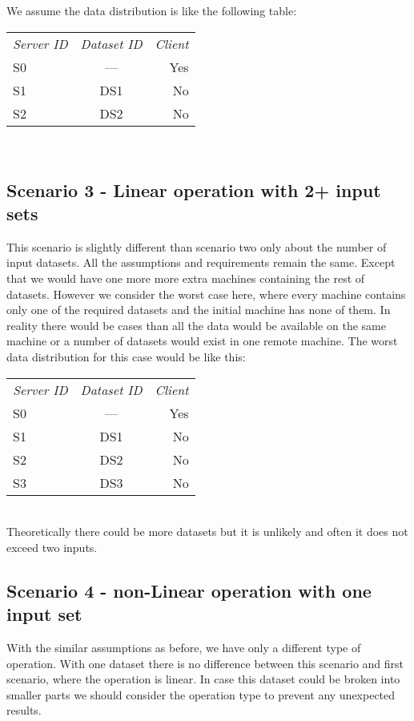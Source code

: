 We assume the data distribution is like the following table:

\begin{tabular}{ l c r }
\em{Server ID} & \em{ Dataset ID} & \em{ Client} \\
S0 & --- & Yes \\
S1 & DS1 & No \\
S2 & DS2 & No \\
\end{tabular}\\

\subsection{Scenario 3 - Linear operation with 2+ input sets}
\label{sc:sc3}
This scenario is slightly different than scenario two only about the number of input datasets. All the assumptions and 
requirements remain the same. Except that we would have one more more extra machines containing the rest of datasets.
However we consider the worst case here, where every machine contains only one of the required datasets and the initial 
machine has none of them.
In reality there would be cases than all the data would be available on the same machine or a number of datasets
would exist in one remote machine. The worst data distribution for this case would be like this:

\begin{tabular}{ l c r }
\em{Server ID} & \em{ Dataset ID} & \em{ Client} \\
S0 & --- & Yes \\
S1 & DS1 & No \\
S2 & DS2 & No \\
S3 & DS3 & No \\
\end{tabular}\\

Theoretically there could be more datasets but it is unlikely and often it does not exceed two inputs.

\subsection{Scenario 4 - non-Linear operation with one input set}
With the similar assumptions as before, we have only a different type of operation. With one dataset there is no 
difference between this scenario and first scenario, where the operation is linear. In case this dataset could
be broken into smaller parts we should consider the operation type to prevent any unexpected results.


